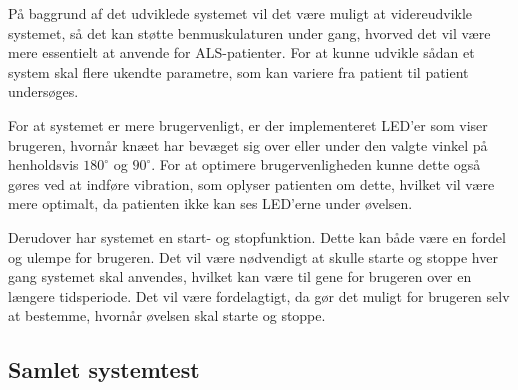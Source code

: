 På baggrund af det udviklede systemet vil det være muligt at videreudvikle systemet, så det kan støtte benmuskulaturen under gang, hvorved det vil være mere essentielt at anvende for ALS-patienter. For at kunne udvikle sådan et system skal flere ukendte parametre, som kan variere fra patient til patient undersøges. 

For at systemet er mere brugervenligt, er der implementeret LED'er som viser brugeren, hvornår knæet har bevæget sig over eller under den valgte vinkel på henholdsvis $180^{\circ}$ og $90^{\circ}$. For at optimere brugervenligheden kunne dette også gøres ved at indføre vibration, som oplyser patienten om dette, hvilket vil være mere optimalt, da patienten ikke kan ses LED'erne under øvelsen.

Derudover har systemet en start- og stopfunktion. Dette kan både være en fordel og ulempe for brugeren. Det vil være nødvendigt at skulle starte og stoppe hver gang systemet skal anvendes, hvilket kan være til gene for brugeren over en længere tidsperiode. Det vil være fordelagtigt, da gør det muligt for brugeren selv at bestemme, hvornår øvelsen skal starte og stoppe.

\subsection{Samlet systemtest}